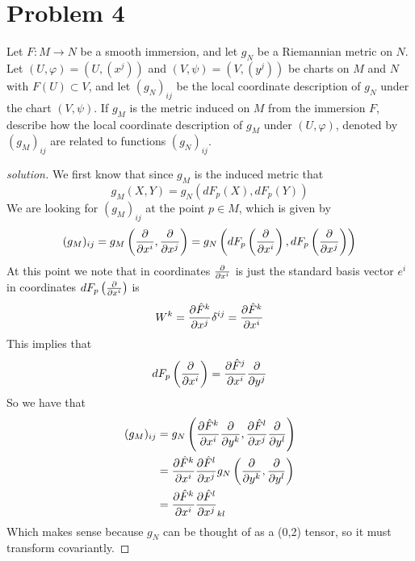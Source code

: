 \documentclass[a4paper]{article}
\begin{document}
\section*{Problem 4}%
Let $F: M \rightarrow N$ be a smooth immersion, and let $g_N$ be a Riemannian metric on $N$. Let $(U, \varphi) = (U, (x^j))$ and $(V, \psi) = (V, (y^j))$ be charts on $M$ and $N$ with $F(U) \subset V$, and let $(g_N)_{ij}$ be the local coordinate description of $g_N$ under the chart $(V, \psi)$. If $g_M$ is the metric induced on $M$ from the immersion $F$, describe how the local coordinate description of $g_M$ under $(U, \varphi)$, denoted by $(g_M)_{ij}$ are related to functions $(g_N)_{ij}$.

\begin{proof}[solution]
 We first know that since $g_M$ is the induced metric that
 \[
   g_M(X,Y) = g_N\left( dF_p(X), dF_p(Y) \right)
 \]
 We are looking for $(g_M)_{ij}$ at the point $p \in M$, which is given by
 \[
   (g_M)_{ij} = g_M\left(\pdv{x^i}, \pdv{x^j}\right) = g_N \left( dF_p \left( \pdv{x^i} \right), dF_p\left(\pdv{x^j}\right) \right)
 \]
 At this point we note that in coordinates $\pdv{x^i}$ is just the standard basis vector $e^i$ in coordinates $dF_p \left( \pdv{x^i} \right)$ is
 \[
   W^k = \pdv{\hat{F}^k}{x^j}\delta^{ij} = \pdv{\hat{F}^k}{x^i} 
 \]
 This implies that 
 \[
   dF_p \left( \pdv{x^i} \right) = \pdv{\hat{F}^j}{x^i} \pdv{y^j}
 \]
 So we have that
 \[
   \begin{aligned}
     (g_M)_{ij} &= g_N \left( \pdv{\hat{F}^k}{x^i} \pdv{y^k}, \pdv{\hat{F}^l}{x^j} \pdv{y^l} \right)\\
                &= \pdv{\hat{F}^k}{x^i} \pdv{\hat{F}^l}{x^j} g_N \left( \pdv{y^k}, \pdv{y^l} \right) \\
                &= \pdv{\hat{F}^k}{x^i} \pdv{\hat{F}^l}{x^j} (g_N)_{kl}
   \end{aligned}
 \]
 Which makes sense because $g_N$ can be thought of as a (0,2) tensor, so it must transform covariantly.
\end{proof}
\end{document}
